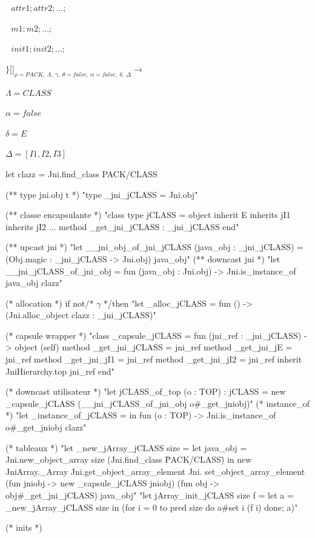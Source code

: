 \documentclass[a4paper, 11pt, notitlepage]{article}
\begin{document}
 $ \ \ \ attr1; attr2; ...;$

  $\ \ \ m1; m2; ...;$

  $\ \ \ init1; init2; ...;$

 $\} ]\!]_{\rho=PACK,\ \Lambda,\ \gamma,\ \theta=false,\ \alpha=false,\ \delta,\ \Delta}\longrightarrow$
\ 
\newline

$\Lambda=CLASS$

$\alpha=false$

$\delta=E$

$\Delta=[I1,I2,I3]$

\begin{OCaml}
   let clazz = Jni.find_class PACK/CLASS

(** type jni.obj t *)
"type _jni_jCLASS = Jni.obj"

(** classe encapsulante *)
"class type jCLASS = object 
   inherit E
   inherits jI1
   inherits jI2 ...
   method _get_jni_jCLASS : _jni_jCLASS
   end"

(** upcast jni *)
"let __jni_obj_of_jni_jCLASS (java_obj : _jni_jCLASS) =
   (Obj.magic : _jni_jCLASS -> Jni.obj) java_obj"
(** downcast jni *)
"let __jni_jCLASS_of_jni_obj =
   fun (java_obj : Jni.obj) ->
     Jni.is_instance_of java_obj clazz"
 
(* allocation *)
if not/* $\gamma$ */then
"let _alloc_jCLASS =
     fun () -> (Jni.alloc_object clazz : _jni_jCLASS)"

(* capsule wrapper *)
"class _capsule_jCLASS = fun (jni_ref : _jni_jCLASS) ->
    object (self)
      method _get_jni_jCLASS = jni_ref
      method _get_jni_jE = jni_ref
      method _get_jni_jI1 = jni_ref
      method _get_jni_jI2 = jni_ref
      inherit JniHierarchy.top jni_ref
    end"

(* downcast utilisateur *)
"let jCLASS_of_top (o : TOP) : jCLASS =
    new _capsule_jCLASS (__jni_jCLASS_of_jni_obj o#_get_jniobj)"
(* instance_of *)
"let _instance_of_jCLASS =
    in fun (o : TOP) -> Jni.is_instance_of o#_get_jniobj clazz"

(* tableaux *)
"let _new_jArray_jCLASS size =
    let java_obj = Jni.new_object_array size (Jni.find_class \"PACK/CLASS\")
    in
      new JniArray._Array Jni.get_object_array_element Jni.
        set_object_array_element (fun jniobj -> new _capsule_jCLASS jniobj)
        (fun obj -> obj#_get_jni_jCLASS) java_obj"
"let jArray_init_jCLASS size f =
    let a = _new_jArray_jCLASS size
    in (for i = 0 to pred size do a#set i (f i) done; a)"

(* inits *)
\end{OCaml}
\end{document}
